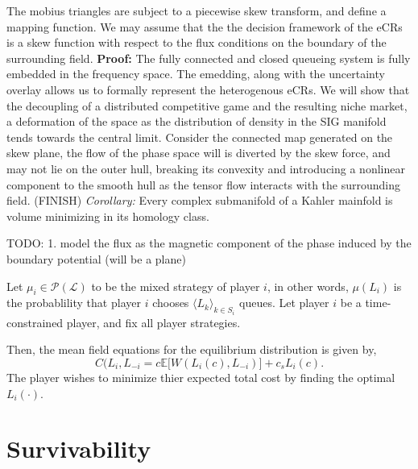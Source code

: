 \documentclass[10pt]{article}
\newcommand{\mcL}{\mathcal{L}}
\newcommand{\mcP}{\mathcal{P}}
\theoremstyle{definition}
\begin{document}
The mobius triangles are subject to a piecewise skew transform, and
define a mapping function. We may assume that the the decision framework of
the eCRs is a skew function with respect to the flux conditions on the boundary
of
the surrounding field. 
{
}
\textbf{Proof:}
The fully connected and closed queueing system is fully
embedded in the frequency space. The emedding, along with the uncertainty
overlay allows us to formally represent the heterogenous eCRs. 
We will show that the decoupling of a distributed competitive game 
and the resulting niche market, a deformation of the space as the distribution
of density in the SIG manifold tends towards the central limit. Consider the
connected map generated on the skew plane, the flow of the phase space will
is diverted by the skew force, and may not lie on the outer hull, breaking
its convexity and introducing a nonlinear component to the smooth hull as
the tensor flow interacts with the surrounding field.
(FINISH)
\emph{Corollary:}
Every complex submanifold of a Kahler mainfold is volume minimizing in its
homology class.

TODO:
1. model the flux as the magnetic
component of the phase induced by the boundary potential (will be a plane)


Let $\mu_i \in \mcP(\mcL)$ to be the mixed strategy
of player $i$, in other words, $\mu(L_i)$ is the probablility that player $i$
chooses $\langle L_k \rangle_{k\in S_i}$ queues. Let player $i$ be a time-constrained player, and fix all player strategies.

Then, the mean field equations for the equilibrium distribution is given by,
$$
C(L_i, L_{-i} = c\mathbb{E}\big\lbrack W(L_i(c),L_{-i})\big\rbrack + c_s L_i(c).
$$
The player wishes to minimize thier expected total cost by finding the optimal $L_i(\cdot)$. 

\section{Survivability}
\end{document}
